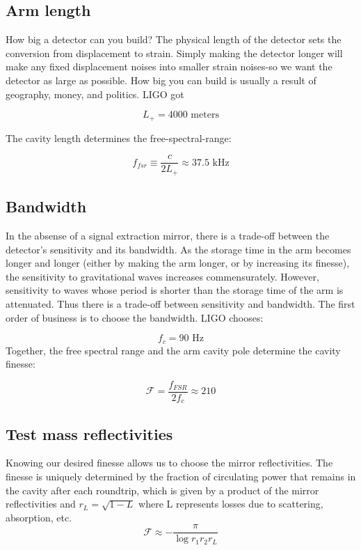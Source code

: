 \subsection*{Arm length}

How big a detector can you build? The physical length of the detector
sets the conversion from displacement to strain. Simply making the
detector longer will make any fixed displacement noises into smaller
strain noises-so we want the detector as large as possible. How big
you can build is usually a result of geography, money, and politics.
LIGO got

\[
\boxed{{L_{+}=4000\text{{\ meters}}}}
\]


The cavity length determines the free-spectral-range:

\[
f_{fsr}\equiv\frac{c}{2L_{+}}\approx37.5\text{ kHz}
\]



\subsection*{Bandwidth}

In the absense of a signal extraction mirror, there is a trade-off
between the detector's sensitivity and its bandwidth. As the storage
time in the arm becomes longer and longer (either by making the arm
longer, or by increasing its finesse), the sensitivity to gravitational
waves increases commensurately. However, sensitivity to waves whose
period is shorter than the storage time of the arm is attenuated.
Thus there is a trade-off between sensitivity and bandwidth. The first
order of business is to choose the bandwidth. LIGO chooses:

\[
f_{c}=90\text{\ Hz}
\]
Together, the free spectral range and the arm cavity pole determine
the cavity finesse:

\[
\mathcal{F}=\frac{f_{FSR}}{2f_{c}}\approx210
\]



\subsection*{Test mass reflectivities}

Knowing our desired finesse allows us to choose the mirror reflectivities.
The finesse is uniquely determined by the fraction of circulating
power that remains in the cavity after each roundtrip, which is given
by a product of the mirror reflectivities and $r_{L}=\sqrt{1-L}$
where L represents losses due to scattering, absorption, etc. 
\[
\mathcal{F}\approx-\frac{\pi}{\log r_{1}r_{2}r_{L}}
\]



